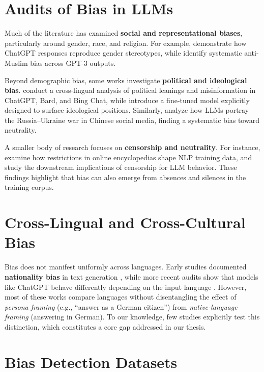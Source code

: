\section{Audits of Bias in LLMs}

Much of the literature has examined \textbf{social and representational biases}, particularly around gender, race, and religion. For example, \textcite{gender_gpt2023} demonstrate how ChatGPT responses reproduce gender stereotypes, while \textcite{persistent_muslim_bias} identify systematic anti-Muslim bias across GPT-3 outputs.  

Beyond demographic bias, some works investigate \textbf{political and ideological bias}. \textcite{silence_llms2023} conduct a cross-lingual analysis of political leanings and misinformation in ChatGPT, Bard, and Bing Chat, while \textcite{opiniongpt2023} introduce a fine-tuned model explicitly designed to surface ideological positions. Similarly, \textcite{russia_china_war2024} analyze how LLMs portray the Russia–Ukraine war in Chinese social media, finding a systematic bias toward neutrality.  

A smaller body of research focuses on \textbf{censorship and neutrality}. For instance, \textcite{censorship_encylopedia} examine how restrictions in online encyclopedias shape NLP training data, and \textcite{impact_censorship2019} study the downstream implications of censorship for LLM behavior. These findings highlight that bias can also emerge from absences and silences in the training corpus.  

\section{Cross-Lingual and Cross-Cultural Bias}

Bias does not manifest uniformly across languages. Early studies documented \textbf{nationality bias} in text generation \parencite{nationality_bias2013}, while more recent audits show that models like ChatGPT behave differently depending on the input language \parencite{silence_llms2023}. However, most of these works compare languages without disentangling the effect of \emph{persona framing} (e.g., “answer as a German citizen”) from \emph{native-language framing} (answering in German). To our knowledge, few studies explicitly test this distinction, which constitutes a core gap addressed in our thesis.  

\section{Bias Detection Datasets}

